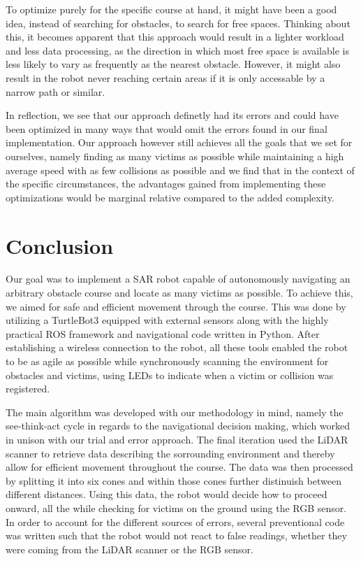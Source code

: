 \documentclass[conference]{IEEEtran}
\begin{document}
To optimize purely for the specific course at hand, it might have been a good idea, instead of searching for obstacles, to search for free spaces.
Thinking about this, it becomes apparent that this approach would result in a lighter workload and less data processing, as the direction in which most free space is available is less likely to vary as frequently as the nearest obstacle.
However, it might also result in the robot never reaching certain areas if it is only accessable by a narrow path or similar.

In reflection, we see that our approach definetly had its errors and could have been optimized in many ways that would omit the errors found in our final implementation.
Our approach however still achieves all the goals that we set for ourselves, namely finding as many victims as possible while maintaining a high average speed with as few collisions as possible and we find that in the context of the specific circumstances, the advantages gained from implementing these optimizations would be marginal relative compared to the added complexity.

\section{Conclusion}
Our goal was to implement a SAR robot capable of autonomously navigating an arbitrary obstacle course and locate as many victims as possible.
To achieve this, we aimed for safe and efficient movement through the course.
This was done by utilizing a TurtleBot3 equipped with external sensors along with the highly practical ROS framework and navigational code written in Python.
After establishing a wireless connection to the robot, all these tools enabled the robot to be as agile as possible while synchronously scanning the environment for obstacles and victims, using LEDs to indicate when a victim or collision was registered.

The main algorithm was developed with our methodology in mind, namely the see-think-act cycle in regards to the navigational decision making, which worked in unison with our trial and error approach.
The final iteration used the LiDAR scanner to retrieve data describing the sorrounding environment and thereby allow for efficient movement throughout the course.
The data was then processed by splitting it into six cones and within those cones further distinuish between different distances.
Using this data, the robot would decide how to proceed onward, all the while checking for victims on the ground using the RGB sensor.
In order to account for the different sources of errors, several preventional code was written such that the robot would not react to false readings, whether they were coming from the LiDAR scanner or the RGB sensor.
\end{document}
